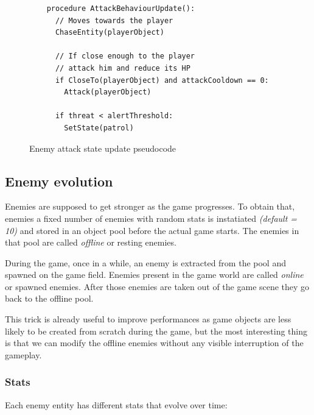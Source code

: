 \documentclass[11pt]{article}
\begin{document}
\begin{figure}
  \begin{lstlisting}
    procedure AttackBehaviourUpdate():
      // Moves towards the player
      ChaseEntity(playerObject) 

      // If close enough to the player
      // attack him and reduce its HP
      if CloseTo(playerObject) and attackCooldown == 0: 
        Attack(playerObject)

      if threat < alertThreshold: 
        SetState(patrol)
  \end{lstlisting}
  \caption{Enemy attack state update pseudocode}
\end{figure}

\FloatBarrier

\subsection{Enemy evolution}
Enemies are supposed to get stronger as the game progresses.
To obtain that, enemies a fixed number of enemies with random stats is instatiated \textit{(default = 10)} and stored in an object pool before the actual game starts. The enemies in that pool are called \textit{offline} or resting enemies.

During the game, once in a while, an enemy is extracted from the pool and spawned on the game field. Enemies present in the game world are called \textit{online} or spawned enemies. After those enemies are taken out of the game scene they go back to the offline pool.

This trick is already useful to improve performances as game objects are less likely to be created from scratch during the game, but the most interesting thing is that we can modify the offline enemies without any visible interruption of the gameplay.

\subsubsection{Stats}
Each enemy entity has different stats that evolve over time:
\end{document}
